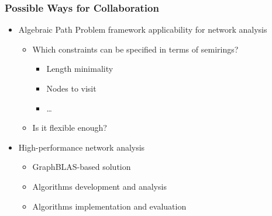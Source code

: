 \documentclass[xcolor=table,aspectratio=169]{beamer}
\begin{document}
\begin{frame}[fragile]
  \frametitle{Possible Ways for Collaboration}
    \begin{itemize}
      \item Algebraic Path Problem framework applicability for network analysis
      \begin{itemize}        
        \item Which constraints can be specified in terms of semirings?
        \begin{itemize}
          \item Length minimality
          \item Nodes to visit
          \item \ldots
        \end{itemize}
        \item Is it flexible enough?
      \end{itemize}
      \item High-performance network analysis
      \begin{itemize}        
        \item GraphBLAS-based solution
        \item Algorithms development and analysis
        \item Algorithms implementation and evaluation
      \end{itemize} 
    \end{itemize}
\end{frame}
\end{document}
